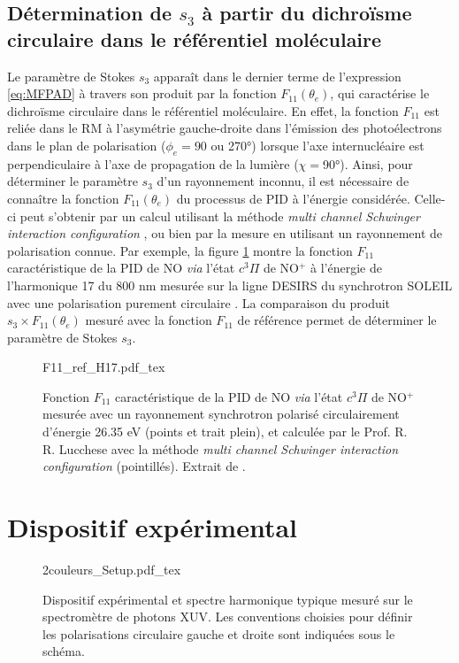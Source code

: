 \subsection{Détermination de $s_3$ à partir du dichroïsme circulaire dans le référentiel moléculaire}
Le paramètre de Stokes $s_3$ apparaît dans le dernier terme de l'expression \ref{eq:MFPAD} à travers son produit par la fonction $F_{11}(\theta_e)$, qui caractérise le dichroïsme circulaire dans le référentiel moléculaire. En effet, la fonction $F_{11}$ est reliée dans le RM à l'asymétrie gauche-droite dans l'émission des photoélectrons dans le plan de polarisation ($\phi_e = 90$ ou 270°) lorsque l'axe internucléaire est perpendiculaire à l'axe de propagation de la lumière ($\chi =$90°). Ainsi, pour déterminer le paramètre $s_3$ d'un rayonnement inconnu, il est nécessaire de connaître la fonction $F_{11}(\theta_e)$ du processus de PID à l'énergie considérée. Celle-ci peut s'obtenir par un calcul utilisant la méthode \textit{multi channel Schwinger interaction configuration} , ou bien par la mesure en utilisant un rayonnement de polarisation connue. Par exemple, la figure \ref{fig:F11_ref_H17} montre la fonction $F_{11}$ caractéristique de la PID de NO \textit{via} l'état $c ^3\Pi$ de NO$^+$ à l'énergie de l'harmonique 17 du 800 nm mesurée sur la ligne DESIRS du synchrotron SOLEIL avec une polarisation purement circulaire . La comparaison du produit $s_3 \times F_{11}(\theta_e)$ mesuré avec la fonction $F_{11}$ de référence permet de déterminer le paramètre de Stokes $s_3$. 

\begin{figure}
\centering
\def\svgwidth{0.6\textwidth}
{F11_ref_H17.pdf_tex}
\caption{Fonction $F_{11}$ caractéristique de la PID de NO \textit{via} l'état $c ^3\Pi$ de NO$^+$ mesurée avec un rayonnement synchrotron polarisé circulairement d'énergie 26.35 eV (points et trait plein), et calculée par le Prof. R. R. Lucchese avec la méthode \textit{multi channel Schwinger interaction configuration} (pointillés). Extrait de .}
\label{fig:F11_ref_H17}
\end{figure}

\section{Dispositif expérimental}
\begin{figure}
\centering
\def\svgwidth{\textwidth}
{2couleurs_Setup.pdf_tex}
\caption{Dispositif expérimental et spectre harmonique typique mesuré sur le spectromètre de photons XUV. Les conventions choisies pour définir les polarisations circulaire gauche et droite sont indiquées sous le schéma.}
\label{fig:2couleurs_Setup}
\end{figure}

